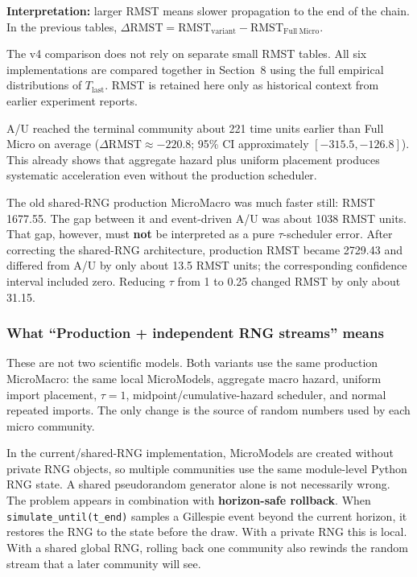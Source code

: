 \documentclass[11pt,a4paper]{article}
\begin{document}
\textbf{Interpretation:} larger RMST means slower propagation to the end of the chain. In the previous tables, $\Delta\mathrm{RMST}=\mathrm{RMST}_{\mathrm{variant}}-\mathrm{RMST}_{\mathrm{Full\ Micro}}$.

\begin{tcolorbox}[colback=white,colframe=boundary,title=v4 reporting rule]
The v4 comparison does not rely on separate small RMST tables. All six implementations are compared together in Section~8 using the full empirical distributions of $T_{\mathrm{last}}$. RMST is retained here only as historical context from earlier experiment reports.
\end{tcolorbox}

A/U reached the terminal community about 221 time units earlier than Full Micro on average ($\Delta\mathrm{RMST}\approx-220.8$; 95\% CI approximately $[-315.5,-126.8]$). This already shows that aggregate hazard plus uniform placement produces systematic acceleration even without the production scheduler.

The old shared-RNG production MicroMacro was much faster still: RMST 1677.55. The gap between it and event-driven A/U was about 1038 RMST units. That gap, however, must \textbf{not} be interpreted as a pure $\tau$-scheduler error. After correcting the shared-RNG architecture, production RMST became 2729.43 and differed from A/U by only about 13.5 RMST units; the corresponding confidence interval included zero. Reducing $\tau$ from 1 to 0.25 changed RMST by only about 31.15.

\subsubsection*{What ``Production + independent RNG streams'' means}
These are not two scientific models. Both variants use the same production MicroMacro: the same local MicroModels, aggregate macro hazard, uniform import placement, $\tau=1$, midpoint/cumulative-hazard scheduler, and normal repeated imports. The only change is the source of random numbers used by each micro community.

In the current/shared-RNG implementation, MicroModels are created without private RNG objects, so multiple communities use the same module-level Python RNG state. A shared pseudorandom generator alone is not necessarily wrong. The problem appears in combination with \textbf{horizon-safe rollback}. When \texttt{simulate\_until(t\_end)} samples a Gillespie event beyond the current horizon, it restores the RNG to the state before the draw. With a private RNG this is local. With a shared global RNG, rolling back one community also rewinds the random stream that a later community will see.
\end{document}
